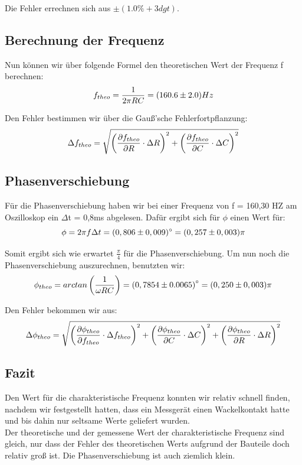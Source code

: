 Die Fehler errechnen sich aus $\pm (1.0\% +3dgt)$.

\subsection{Berechnung der Frequenz}
Nun können wir über folgende Formel den theoretischen Wert der Frequenz f berechnen:
\begin{equation}\notag
f_{theo}=\frac{1}{2\pi RC}= (160.6 \pm 2.0)Hz
\end{equation}

Den Fehler bestimmen wir über die Gauß'sche Fehlerfortpflanzung:
\begin{equation}\notag
\Delta f_{theo}=\sqrt{\left(\frac{\partial f_{theo}}{\partial R}\cdot \Delta R\right)^2+\left(\frac{\partial f_{theo}}{\partial C}\cdot \Delta C\right)^2}
\end{equation}

\subsection{Phasenverschiebung}
Für die Phasenverschiebung haben wir bei einer Frequenz von f = 160,30 HZ am Oszilloskop ein \(\Delta\)t = 0,8ms abgelesen. Dafür ergibt sich für \(\phi\) einen Wert für:
\begin{equation}
\notag
\phi = 2\pi f \Delta t = (0,806 \pm 0,009)^\circ = (0,257\pm 0,003)\pi
\end{equation}

Somit ergibt sich wie erwartet \(\frac{\pi}{4}\) für die Phasenverschiebung.
Um nun noch die Phasenverschiebung auszurechnen, benutzten wir:
\begin{equation}\notag
\phi_{theo}=arctan\left(\frac{1}{\omega RC}\right)=\left(0,7854 \pm 0.0065\right)^\circ =(0,250\pm 0,003)\pi
\end{equation}

Den Fehler bekommen wir aus:
\begin{equation}\notag
\Delta \phi_{theo}=\sqrt{\left(\frac{\partial \phi_{theo}}{\partial f_{theo}}\cdot \Delta f_{theo}\right)^2+\left(\frac{\partial \phi_{theo}}{\partial C}\cdot \Delta C\right)^2+\left(\frac{\partial \phi_{theo}}{\partial R}\cdot \Delta R\right)^2}
\end{equation}

\subsection*{Fazit}
Den Wert für die charakteristische Frequenz konnten wir relativ schnell finden, nachdem wir festgestellt hatten, dass ein Messgerät einen Wackelkontakt hatte und bis dahin nur seltsame Werte geliefert wurden.\\
Der theoretische und der gemessene Wert der charakteristische Frequenz sind gleich, nur dass der Fehler des theoretischen Werts aufgrund der Bauteile doch relativ groß ist. Die Phasenverschiebung ist auch ziemlich klein.